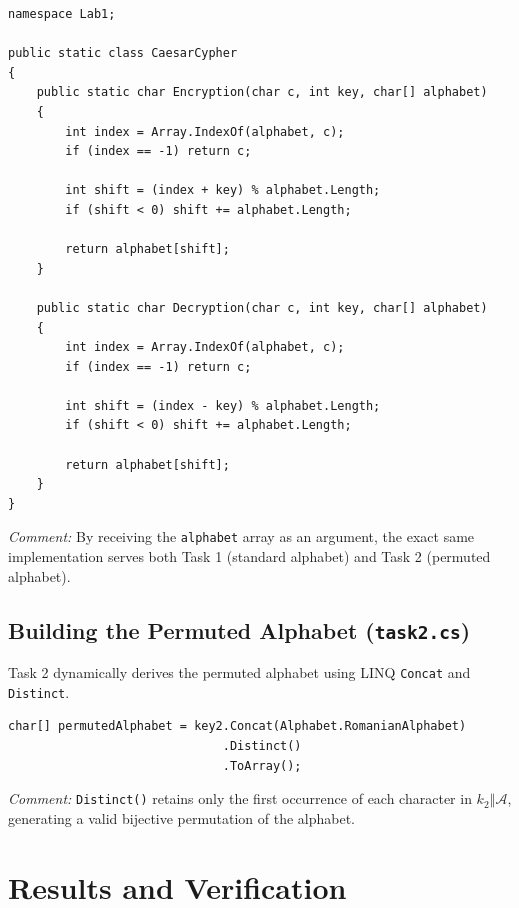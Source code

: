 \documentclass[12pt,a4paper]{article}
\begin{document}
\begin{lstlisting}[style=csharpstyle, caption={Encryption and Decryption functions in CaesarCypher.cs}]
namespace Lab1;

public static class CaesarCypher
{
    public static char Encryption(char c, int key, char[] alphabet)
    {
        int index = Array.IndexOf(alphabet, c);
        if (index == -1) return c;

        int shift = (index + key) % alphabet.Length;
        if (shift < 0) shift += alphabet.Length;

        return alphabet[shift];
    }

    public static char Decryption(char c, int key, char[] alphabet)
    {
        int index = Array.IndexOf(alphabet, c);
        if (index == -1) return c;

        int shift = (index - key) % alphabet.Length;
        if (shift < 0) shift += alphabet.Length;

        return alphabet[shift];
    }
}
\end{lstlisting}
\textit{Comment:} By receiving the \texttt{alphabet} array as an argument, the exact same implementation serves both Task 1 (standard alphabet) and Task 2 (permuted alphabet).

\subsection{Building the Permuted Alphabet (\texttt{task2.cs})}
Task 2 dynamically derives the permuted alphabet using LINQ \texttt{Concat} and \texttt{Distinct}.

\begin{lstlisting}[style=csharpstyle, caption={Alphabet permutation logic in task2.cs}]
char[] permutedAlphabet = key2.Concat(Alphabet.RomanianAlphabet)
                              .Distinct()
                              .ToArray();
\end{lstlisting}
\textit{Comment:} \texttt{Distinct()} retains only the first occurrence of each character in $k_2 \mathbin{\Vert} \mathcal{A}$, generating a valid bijective permutation of the alphabet.

\section{Results and Verification}
\end{document}
